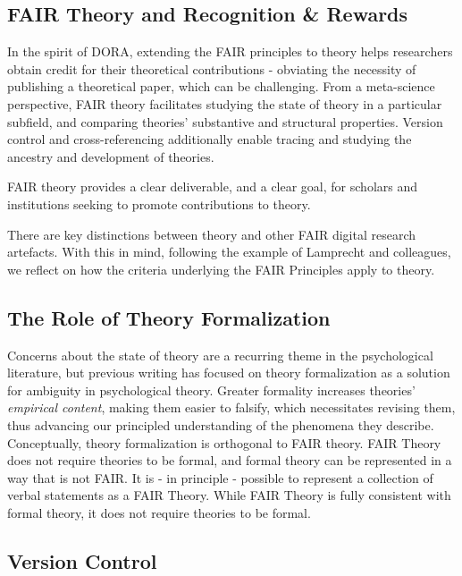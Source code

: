 \documentclass[
  man]{apa6}
\newenvironment{lltable}{\begin{landscape}\centering\begin{ThreePartTable}}{\end{ThreePartTable}\end{landscape}}
\begin{document}
\begin{lltable}
\end{lltable}

\subsection{FAIR Theory and Recognition \& Rewards}\label{fair-theory-and-recognition-rewards}

In the spirit of DORA, extending the FAIR principles to theory helps researchers obtain credit for their theoretical contributions - obviating the necessity of publishing a theoretical paper, which can be challenging.
From a meta-science perspective, FAIR theory facilitates studying the state of theory in a particular subfield, and comparing theories' substantive and structural properties. Version control and cross-referencing additionally enable tracing and studying the ancestry and development of theories.

FAIR theory provides a clear deliverable, and a clear goal, for scholars and institutions seeking to promote contributions to theory.

There are key distinctions between theory and other FAIR digital research artefacts. With this in mind, following the example of Lamprecht and colleagues, we reflect on how the criteria underlying the FAIR Principles apply to theory.

\subsection{The Role of Theory Formalization}\label{the-role-of-theory-formalization}

Concerns about the state of theory are a recurring theme in the psychological literature,
but previous writing has focused on theory formalization as a solution for ambiguity in psychological theory.
Greater formality increases theories' \emph{empirical content},
making them easier to falsify,
which necessitates revising them,
thus advancing our principled understanding of the phenomena they describe.
Conceptually, theory formalization is orthogonal to FAIR theory.
FAIR Theory does not require theories to be formal, and formal theory can be represented in a way that is not FAIR.
It is - in principle - possible to represent a collection of verbal statements as a FAIR Theory.
While FAIR Theory is fully consistent with formal theory, it does not require theories to be formal.

\subsection{Version Control}\label{version-control}
\end{document}
